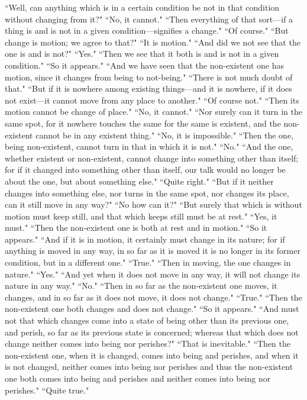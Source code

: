\documentclass[letterpaper,12pt]{article}
\newcommand{\stephpag}[1]{\marginnote{\small\itshape\fontfamily{ppl}\selectfont #1}}
\begin{document}
``Well, can anything which is in a certain condition be not in that condition without changing from it?" ``No, it cannot." ``Then everything of that sort—if a thing is and is not in a given condition—signifies a change." \stephpag{c} ``Of course." ``But change is motion; we agree to that?" ``It is motion." ``And did we not see that the one is and is not?" ``Yes." ``Then we see that it both is and is not in a given condition." ``So it appears." ``And we have seen that the non-existent one has motion, since it changes from being to not-being." ``There is not much doubt of that." ``But if it is nowhere among existing things—and it is nowhere, if it does not exist—it cannot move from any place to another." ``Of course not." ``Then its motion cannot be change of place." ``No, it cannot." \stephpag{d} ``Nor surely can it turn in the same spot, for it nowhere touches the same for the same is existent, and the non-existent cannot be in any existent thing." ``No, it is impossible." ``Then the one, being non-existent, cannot turn in that in which it is not." ``No." ``And the one, whether existent or non-existent, cannot change into something other than itself; for if it changed into something other than itself, our talk would no longer be about the one, but about something else." ``Quite right." ``But if it neither changes into something else, \stephpag{e} nor turns in the same spot, nor changes its place, can it still move in any way?" ``No how can it?" ``But surely that which is without motion must keep still, and that which keeps still must be at rest." ``Yes, it must." ``Then the non-existent one is both at rest and in motion." ``So it appears." ``And if it is in motion, it certainly must change in its nature; \stephpag{163 a} for if anything is moved in any way, in so far as it is moved it is no longer in its former condition, but in a different one." ``True." ``Then in moving, the one changes in nature." ``Yes." ``And yet when it does not move in any way, it will not change its nature in any way." ``No." ``Then in so far as the non-existent one moves, it changes, and in so far as it does not move, it does not change." ``True." ``Then the non-existent one both changes and does not change." ``So it appears." ``And must not that which changes come into a state of being other than its previous one, and perish, so far as its previous state is concerned; \stephpag{b} whereas that which does not change neither comes into being nor perishes?" ``That is inevitable." ``Then the non-existent one, when it is changed, comes into being and perishes, and when it is not changed, neither comes into being nor perishes and thus the non-existent one both comes into being and perishes and neither comes into being nor perishes." ``Quite true."
\end{document}
